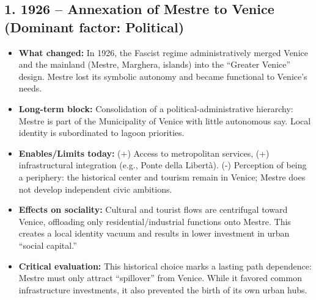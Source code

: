 \documentclass[a4paper,11pt]{article}
\begin{document}
\subsection*{1. 1926 – Annexation of Mestre to Venice (Dominant factor: Political)}
\begin{itemize}
    \item \textbf{What changed:} In 1926, the Fascist regime administratively merged Venice and the mainland (Mestre, Marghera, islands) into the ``Greater Venice'' design. Mestre lost its symbolic autonomy and became functional to Venice's needs.
    \item \textbf{Long-term block:} Consolidation of a political-administrative hierarchy: Mestre is part of the Municipality of Venice with little autonomous say. Local identity is subordinated to lagoon priorities.
    \item \textbf{Enables/Limits today:} (+) Access to metropolitan services, (+) infrastructural integration (e.g., Ponte della Libert\`a). (-) Perception of being a periphery: the historical center and tourism remain in Venice; Mestre does not develop independent civic ambitions.
    \item \textbf{Effects on sociality:} Cultural and tourist flows are centrifugal toward Venice, offloading only residential/industrial functions onto Mestre. This creates a local identity vacuum and results in lower investment in urban ``social capital.''
    \item \textbf{Critical evaluation:} This historical choice marks a lasting path dependence: Mestre must only attract ``spillover'' from Venice. While it favored common infrastructure investments, it also prevented the birth of its own urban hubs.
\end{itemize}
\end{document}
